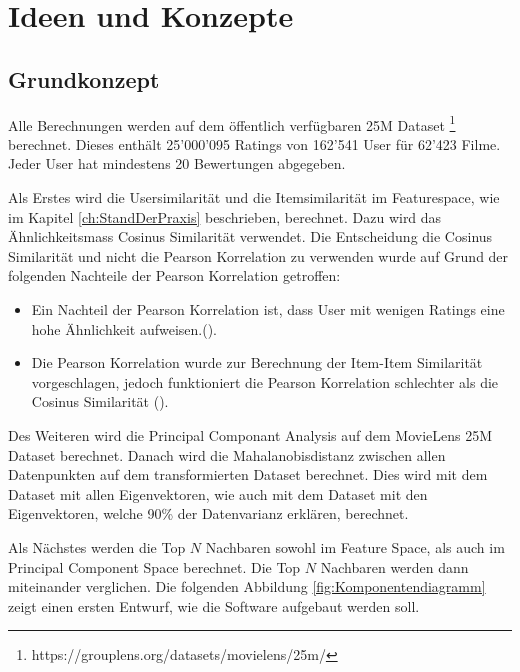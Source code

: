 \chapter{Ideen und Konzepte}
\label{sec: Ideen, Konzepte}
\section{Grundkonzept}


Alle Berechnungen werden auf dem öffentlich verfügbaren 25M Dataset \footnote{https://grouplens.org/datasets/movielens/25m/} berechnet. Dieses enthält 25'000'095 Ratings von 162'541 User für 62'423 Filme. Jeder User hat mindestens 20 Bewertungen abgegeben. \cite{DatasetReadme}

 Als Erstes wird die Usersimilarität und die Itemsimilarität im Featurespace, wie im Kapitel \ref{ch:StandDerPraxis}  beschrieben, berechnet. Dazu wird das Ähnlichkeitsmass Cosinus Similarität verwendet. Die Entscheidung die Cosinus Similarität und nicht die Pearson Korrelation zu verwenden wurde auf Grund der folgenden Nachteile der Pearson Korrelation getroffen:
\begin{itemize}
    \item Ein Nachteil der Pearson Korrelation ist, dass User mit wenigen Ratings eine hohe Ähnlichkeit aufweisen.(\cite{Ekstrand2011}).
    \item Die Pearson Korrelation wurde zur Berechnung der Item-Item Similarität vorgeschlagen, jedoch funktioniert die Pearson Korrelation schlechter als die Cosinus Similarität (\cite{10.1145/371920.372071}).
    
    
\end{itemize}

Des Weiteren wird die Principal Componant Analysis auf dem MovieLens 25M Dataset berechnet. Danach wird die Mahalanobisdistanz zwischen allen Datenpunkten auf dem transformierten Dataset berechnet. Dies wird mit dem Dataset mit allen Eigenvektoren, wie auch mit dem Dataset mit den Eigenvektoren, welche 90\% der Datenvarianz erklären, berechnet.

Als Nächstes werden die Top $N$ Nachbaren sowohl im Feature Space, als auch im Principal Component Space berechnet. Die Top $N$ Nachbaren werden dann miteinander verglichen. Die folgenden Abbildung \ref{fig:Komponentendiagramm} zeigt einen ersten Entwurf, wie die Software aufgebaut werden soll.

